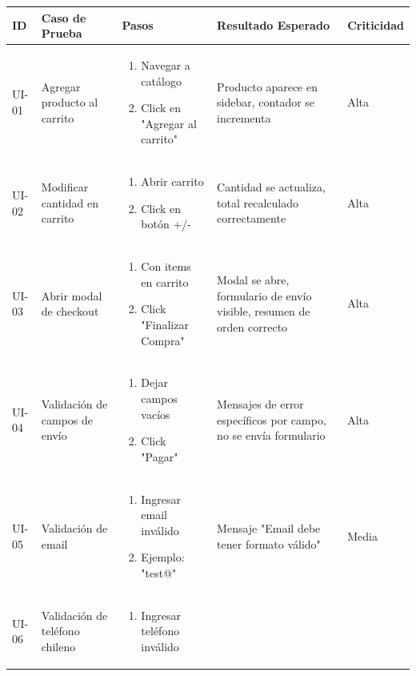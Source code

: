 \documentclass[12pt,a4paper]{article}
\begin{document}
\begin{longtable}{|p{1cm}|p{3cm}|p{4cm}|p{3cm}|p{3cm}|}
\hline
\textbf{ID} & \textbf{Caso de Prueba} & \textbf{Pasos} & \textbf{Resultado Esperado} & \textbf{Criticidad} \\
\hline
\endfirsthead
UI-01 & Agregar producto al carrito &
\begin{enumerate}[leftmargin=*,nosep]
    \item Navegar a catálogo
    \item Click en "Agregar al carrito"
\end{enumerate} &
Producto aparece en sidebar, contador se incrementa & Alta \\
\hline
UI-02 & Modificar cantidad en carrito &
\begin{enumerate}[leftmargin=*,nosep]
    \item Abrir carrito
    \item Click en botón +/-
\end{enumerate} &
Cantidad se actualiza, total recalculado correctamente & Alta \\
\hline
UI-03 & Abrir modal de checkout &
\begin{enumerate}[leftmargin=*,nosep]
    \item Con items en carrito
    \item Click "Finalizar Compra"
\end{enumerate} &
Modal se abre, formulario de envío visible, resumen de orden correcto & Alta \\
\hline
UI-04 & Validación de campos de envío &
\begin{enumerate}[leftmargin=*,nosep]
    \item Dejar campos vacíos
    \item Click "Pagar"
\end{enumerate} &
Mensajes de error específicos por campo, no se envía formulario & Alta \\
\hline
UI-05 & Validación de email &
\begin{enumerate}[leftmargin=*,nosep]
    \item Ingresar email inválido
    \item Ejemplo: "test@"
\end{enumerate} &
Mensaje "Email debe tener formato válido" & Media \\
\hline
UI-06 & Validación de teléfono chileno &
\begin{enumerate}[leftmargin=*,nosep]
    \item Ingresar teléfono inválido

\end{enumerate}
\end{longtable}
\end{document}

